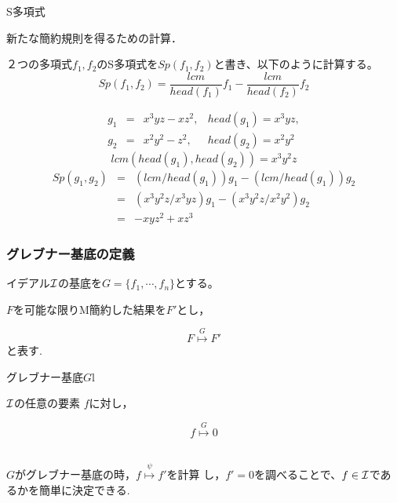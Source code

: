 \begin{frame}
\begin{block}{S多項式}

新たな簡約規則を得るための計算．

２つの多項式$f_1,f_2$のS多項式を$Sp(f_1,f_2)$と書き、以下のように計算する。
\[
Sp(f_1,f_2)= \frac{lcm}{head(f_1)} f_1 - \frac{lcm}{head(f_2)}f_2 
\]
\end{block}

\begin{exampleblock}{}
 \[
 \begin{array}{lcrr}
 g_1 & = & x^3yz - xz^2, & head(g_1) = x^3yz,\\
 g_2 & = & x^2y^2 - z^2, & head(g_2) = x^2y^2
 \end{array}
 \]
 \[
 lcm(head(g_1), head(g_2)) = x^3y^2z
 \]
 \[
 \begin{array}{lcr} 
  Sp(g_1,g_2) & = & ( lcm / head(g_1) ) g_1 - ( lcm / head(g_1)) g_2 \\
  & = & ( x^3y^2z / x^3yz ) g_1 - ( x^3y^2z / x^2y^2 ) g_2 \\
  & = & -xyz^2 + xz^3
 \end{array}
\]
\end{exampleblock}
\end{frame}

\begin{frame}\frametitle{グレブナー基底の定義}

イデアル${\cal I}$の基底を$ G = \{ f_1,\cdots,f_n \} $とする。

$F$を可能な限りM簡約した結果を$F'$とし，

\[F \stackrel{G}{\longmapsto} F' \] と表す.

\begin{block}{グレブナー基底$ G $l}

${\cal I}$の任意の要素 $f$に対し，

\[
	f \stackrel{G}{\longmapsto} 0 
\]
\end{block}
\ \\
$ G $がグレブナー基底の時，$f \stackrel{\psi}{\longmapsto} f' $を計算
し，$f'=0$を調べることで、$f \in {\cal I}$であるかを簡単に決定できる.
\end{frame}

